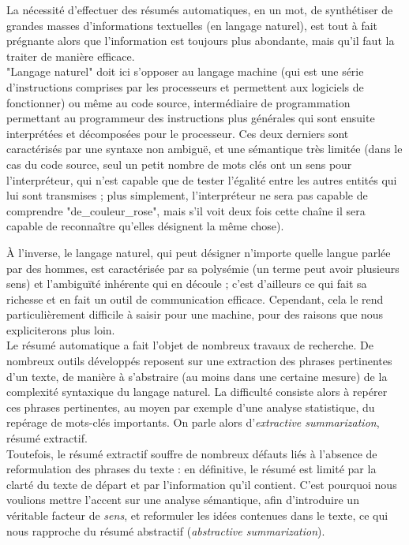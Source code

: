 \documentclass[a4paper, 12pt]{article}
\begin{document}
La nécessité d'effectuer des résumés automatiques, en un mot, de synthétiser de grandes masses d'informations textuelles (en langage naturel), est tout à fait prégnante alors que l'information est toujours plus abondante, mais qu'il faut la traiter de manière efficace.\\

"Langage naturel" doit ici s'opposer au langage machine (qui est une série d'instructions comprises par les processeurs et permettent aux logiciels de fonctionner) ou même au code source, intermédiaire de programmation permettant au programmeur des instructions plus générales qui sont ensuite interprétées et décomposées pour le processeur. Ces deux derniers sont caractérisés par une syntaxe non ambiguë, et une sémantique très limitée (dans le cas du code source, seul un petit nombre de mots clés ont un sens pour l'interpréteur, qui n'est capable que de tester l'égalité entre les autres entités qui lui sont transmises ; plus simplement, l'interpréteur ne sera pas capable de comprendre "de\_couleur\_rose", mais s'il voit deux fois cette chaîne il sera capable de reconnaître qu'elles désignent la même chose).

À l'inverse, le langage naturel, qui peut désigner n'importe quelle langue parlée par des hommes, est caractérisée par sa polysémie (un terme peut avoir plusieurs sens) et l'ambiguïté inhérente qui en découle ; c'est d'ailleurs ce qui fait sa richesse et en fait un outil de communication efficace. Cependant, cela le rend particulièrement difficile à saisir pour une machine, pour des raisons que nous expliciterons plus loin.\\

Le résumé automatique a fait l'objet de nombreux travaux de recherche. De nombreux outils développés reposent sur une extraction des phrases pertinentes d'un texte, de manière à s'abstraire (au moins dans une certaine mesure) de la complexité syntaxique du langage naturel. La difficulté consiste alors à repérer ces phrases pertinentes, au moyen par exemple d'une analyse statistique, du repérage de mots-clés importants. On parle alors d'\textit{extractive summarization}, résumé extractif.\\

Toutefois, le résumé extractif souffre de nombreux défauts liés à l'absence de reformulation des phrases du texte : en définitive, le résumé est limité par la clarté du texte de départ et par l'information qu'il contient. C'est pourquoi nous voulions mettre l'accent sur une analyse sémantique, afin d'introduire un véritable facteur de \textit{sens}, et reformuler les idées contenues dans le texte, ce qui nous rapproche du résumé abstractif (\textit{abstractive summarization}).\\
\end{document}
